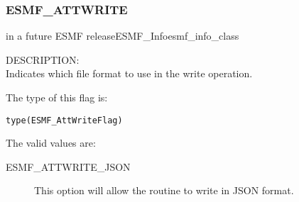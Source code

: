 \subsubsection{ESMF\_ATTWRITE}
\label{const:attwrite}
{in a future ESMF release}{ESMF\_Info}{esmf_info_class}

{\sf DESCRIPTION:\\}
Indicates which file format to use in the write operation.

The type of this flag is:

{\tt type(ESMF\_AttWriteFlag)}

The valid values are:
\begin{description}
	\item[ESMF\_ATTWRITE\_JSON]
	This option will allow the routine to write in JSON format.
\end{description}
